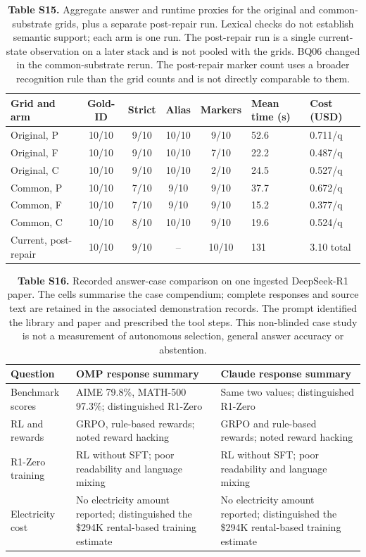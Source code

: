 \begin{table}
\centering
\small
\setlength{\tabcolsep}{4pt}
\caption{\textbf{Table S15.} Aggregate answer and runtime proxies for the original and
common-substrate grids, plus a separate post-repair run. Lexical checks do
not establish semantic support; each arm is one run. The post-repair run is
a single current-state observation on a later stack and is not pooled with
the grids. BQ06 changed in the common-substrate rerun. The post-repair
marker count uses a broader recognition rule than the grid counts and is not
directly comparable to them.}

\begin{tabular}{@{}p{3.960cm}*{4}{c}p{1.980cm}p{2.475cm}@{}}
\toprule
Grid and arm & Gold-ID & Strict & Alias & Markers & Mean time (s) & Cost (USD)\\
\midrule
Original, P & 10/10 & 9/10 & 10/10 & 9/10 & 52.6 & 0.711/q\\
Original, F & 10/10 & 9/10 & 10/10 & 7/10 & 22.2 & 0.487/q\\
Original, C & 10/10 & 9/10 & 10/10 & 2/10 & 24.5 & 0.527/q\\
Common, P & 10/10 & 7/10 & 9/10 & 9/10 & 37.7 & 0.672/q\\
Common, F & 10/10 & 7/10 & 9/10 & 9/10 & 15.2 & 0.377/q\\
Common, C & 10/10 & 8/10 & 10/10 & 9/10 & 19.6 & 0.524/q\\
Current, post-repair & 10/10 & 9/10 & -- & 10/10 & 131 & 3.10 total\\
\bottomrule
\end{tabular}
\end{table}
\begin{table}
\centering\small
\caption{\textbf{Table S16.} Recorded answer-case comparison on one ingested DeepSeek-R1 paper.
The cells summarise the case compendium; complete responses and source text
are retained in the associated demonstration records. The prompt identified
the library and paper and prescribed the tool steps. This non-blinded case
study is not a measurement of autonomous selection, general answer accuracy or
abstention.}

\begin{tabular}{@{}p{2.970cm}p{5.775cm}p{5.775cm}@{}}
\toprule
Question & OMP response summary & Claude response summary \\
\midrule
Benchmark scores & AIME 79.8\%, MATH-500 97.3\%; distinguished R1-Zero & Same two values; distinguished R1-Zero \\
RL and rewards & GRPO, rule-based rewards; noted reward hacking & GRPO and rule-based rewards; noted reward hacking \\
R1-Zero training & RL without SFT; poor readability and language mixing & RL without SFT; poor readability and language mixing \\
Electricity cost & No electricity amount reported; distinguished the \$294K rental-based training estimate & No electricity amount reported; distinguished the \$294K rental-based training estimate \\
\bottomrule
\end{tabular}
\end{table}
